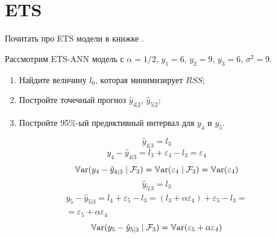 

\chapter{ETS}

Почитать про ETS модели в книжке \cite{hyndman2018forecasting}.

\begin{problem}
  Рассмотрим ETS-ANN модель с $\alpha = 1/2$, $y_1=6$, $y_2=9$, $y_3 = 6$, $\sigma^2=9$.


  \begin{enumerate}
    \item Найдите величину $l_0$, которая минимизирует $RSS$;
    \item Постройте точечный прогноз $\hat y_{4|2}$, $\hat y_{5|2}$;
     \item Постройте 95\%-ый предиктивный интервал для $y_{4}$ и $y_{5}$.
  \end{enumerate}
\begin{sol}
  \[
    \hat y_{4|3} = l_3 
  \]
  \[
    y_4 - \hat y_{4|3} = l_3 + \varepsilon_4 - l_3 = \varepsilon_4  
  \]
  \[
  \operatorname{\mathbb{V}\mathrm{ar}}(y_4 - \hat y_{4|3} \mid \mathcal{F}_3) = \operatorname{\mathbb{V}\mathrm{ar}}(\varepsilon_4 \mid \mathcal{F}_3) = \operatorname{\mathbb{V}\mathrm{ar}}(\varepsilon_4)  
  \]
  \[
  \hat y_{5|3} = l_3 
  \]
  \begin{multline}
  y_5 - \hat y_{5|3} = l_4  + \varepsilon_5 - l_3  = (l_3 + \alpha \varepsilon_4)  + 
   \varepsilon_5 - l_3 = \\
  = \varepsilon_5 + \alpha  \varepsilon_4 
  \end{multline}
  \[
  \operatorname{\mathbb{V}\mathrm{ar}}(y_5 - \hat y_{5|3} \mid \mathcal{F}_3) = \operatorname{\mathbb{V}\mathrm{ar}}(\varepsilon_5 + \alpha  \varepsilon_4 )  
  \]
    
\end{sol}
\end{problem}

